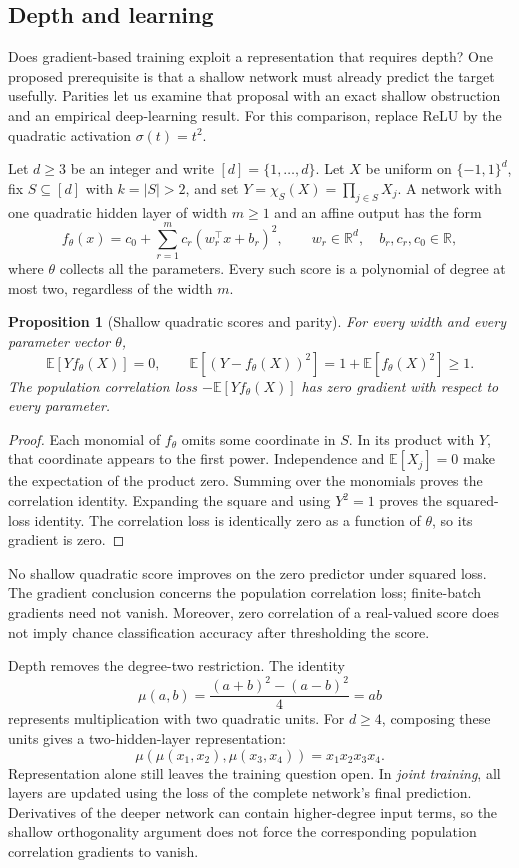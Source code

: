 \documentclass[11pt,twoside]{article}
\newcommand{\E}{\mathbb E}
\newcommand{\R}{\mathbb R}
\newtheorem{proposition}[theorem]{Proposition}
\theoremstyle{definition}
\theoremstyle{remark}
\begin{document}
\subsection{Depth and learning}
\label{sec:depth-learning}

Does gradient-based training exploit a representation that requires depth?
One proposed prerequisite is that a shallow network must already predict the
target usefully. Parities let us examine that proposal with an exact shallow
obstruction and an empirical deep-learning result. For this comparison,
replace ReLU by the quadratic activation $\sigma(t)=t^2$.

Let $d\geq3$ be an integer and write $[d]=\{1,\ldots,d\}$. Let $X$ be
uniform on $\{-1,1\}^d$, fix $S\subseteq[d]$ with $k=|S|>2$, and set
$Y=\chi_S(X)=\prod_{j\in S}X_j$. A network with one quadratic hidden
layer of width $m\geq1$ and an affine output has the form
\[
 f_\theta(x)=c_0+\sum_{r=1}^m c_r(w_r^\top x+b_r)^2,
 \qquad w_r\in\R^d,\quad b_r,c_r,c_0\in\R,
\]
where $\theta$ collects all the parameters. Every such score is a polynomial
of degree at most two, regardless of the width $m$.

\begin{proposition}[Shallow quadratic scores and parity]
\label{prop:quadratic-parity}
For every width and every parameter vector $\theta$,
\[
 \E[Yf_\theta(X)]=0,
 \qquad
 \E[(Y-f_\theta(X))^2]=1+\E[f_\theta(X)^2]\geq1.
\]
The population correlation loss $-\E[Yf_\theta(X)]$ has zero gradient with
respect to every parameter.
\end{proposition}

\begin{proof}
Each monomial of $f_\theta$ omits some coordinate in $S$. In its product
with $Y$, that coordinate appears to the first power. Independence and
$\E[X_j]=0$ make the expectation of the product zero. Summing over the
monomials proves the correlation identity. Expanding the square and using
$Y^2=1$ proves the squared-loss identity. The correlation loss is identically
zero as a function of $\theta$, so its gradient is zero.
\end{proof}

No shallow quadratic score improves on the zero predictor under squared
loss. The gradient conclusion concerns the population correlation loss;
finite-batch gradients need not vanish. Moreover, zero correlation of a
real-valued score does not imply chance classification accuracy after
thresholding the score.

Depth removes the degree-two restriction. The identity
\[
 \mu(a,b)=\frac{(a+b)^2-(a-b)^2}{4}=ab
\]
represents multiplication with two quadratic units. For $d\geq4$, composing
these units gives a two-hidden-layer representation:
\[
 \mu(\mu(x_1,x_2),\mu(x_3,x_4))=x_1x_2x_3x_4.
\]
Representation alone still leaves the training question open.
In \emph{joint training}, all layers are updated using the loss of the
complete network's final prediction. Derivatives of the deeper network can
contain higher-degree input terms, so the shallow orthogonality argument
does not force the corresponding population correlation gradients to vanish.
\end{document}
